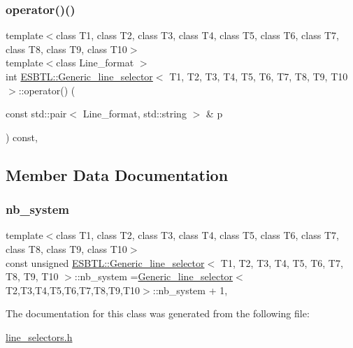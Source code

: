 \subsubsection{\texorpdfstring{operator()()}{operator()()}}
{\footnotesize\ttfamily template$<$class T1, class T2, class T3, class T4, class T5, class T6, class T7, class T8, class T9, class T10$>$ \\
template$<$class Line\+\_\+format $>$ \\
int \hyperlink{classESBTL_1_1Generic__line__selector}{E\+S\+B\+T\+L\+::\+Generic\+\_\+line\+\_\+selector}$<$ T1, T2, T3, T4, T5, T6, T7, T8, T9, T10 $>$\+::operator() (\begin{DoxyParamCaption}\item[{const std\+::pair$<$ Line\+\_\+format, std\+::string $>$ \&}]{p }\end{DoxyParamCaption}) const\hspace{0.3cm}{\ttfamily [inline]}, {\ttfamily [protected]}}



\subsection{Member Data Documentation}
\mbox{\label{classESBTL_1_1Generic__line__selector_a1dd59942b4571825b8d969813975e573}} 
\subsubsection{\texorpdfstring{nb\+\_\+system}{nb\_system}}
{\footnotesize\ttfamily template$<$class T1, class T2, class T3, class T4, class T5, class T6, class T7, class T8, class T9, class T10$>$ \\
const unsigned \hyperlink{classESBTL_1_1Generic__line__selector}{E\+S\+B\+T\+L\+::\+Generic\+\_\+line\+\_\+selector}$<$ T1, T2, T3, T4, T5, T6, T7, T8, T9, T10 $>$\+::nb\+\_\+system =\hyperlink{classESBTL_1_1Generic__line__selector}{Generic\+\_\+line\+\_\+selector}$<$T2,T3,T4,T5,T6,T7,T8,T9,T10$>$\+::nb\+\_\+system + 1\hspace{0.3cm}{\ttfamily [static]}, {\ttfamily [protected]}}



The documentation for this class was generated from the following file\+:\begin{DoxyCompactItemize}
\item 
\hyperlink{line__selectors_8h}{line\+\_\+selectors.\+h}\end{DoxyCompactItemize}
